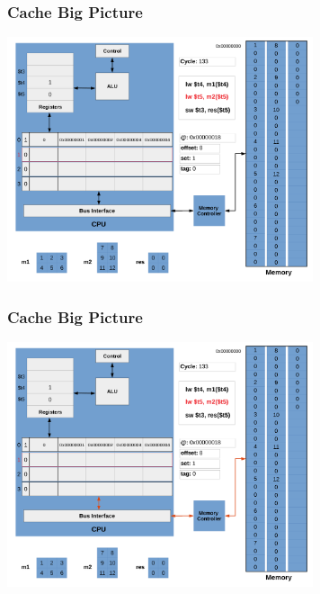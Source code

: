 \documentclass{beamer}
\begin{document}
\begin{frame}[fragile]
\frametitle{Cache Big Picture}

\begin{center}
\vspace*{-0.23cm}
\hspace*{-1cm}\includegraphics[width=9cm]{cache9.pdf}
\end{center}

\end{frame}

\begin{frame}[fragile]
\frametitle{Cache Big Picture}

\begin{center}
\vspace*{-0.23cm}
\hspace*{-1cm}\includegraphics[width=9cm]{cache10.pdf}
\end{center}

\end{frame}
\end{document}
